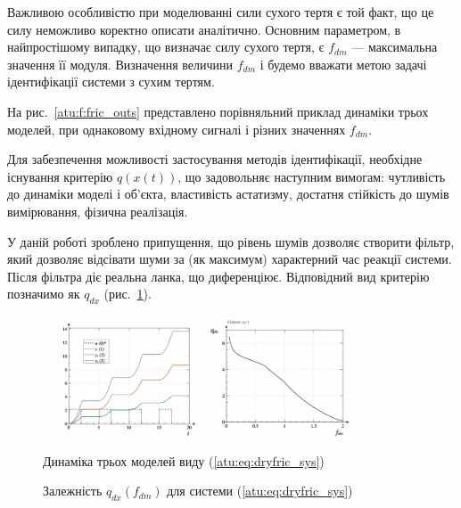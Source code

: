 \documentclass[a4paper,13pt]{atuaref}
\begin{document}
Важливою особливістю при моделюванні сили сухого тертя є той факт, що це силу
неможливо коректно описати аналітично. Основним параметром, в найпростішому
випадку, що визначає силу сухого тертя, є $f_{dm}$ --- максимальна значення її
модуля. Визначення величини  $f_{dm}$ і будемо вважати метою задачі ідентифікації
системи з сухим тертям.

На рис.~\ref{atu:f:fric_outs}
представлено порівняльний приклад динаміки трьох моделей,
при однаковому вхідному сигналі і різних значеннях $f_{dm}$.

Для забезпечення можливості застосування методів ідентифікації, необхідне
існування критерію $q (x (t))$, що задовольняє наступним вимогам: чутливість
до динаміки моделі і об'єкта, властивість астатизму, достатня стійкість до
шумів вимірювання, фізична реалізація.

У даній роботі зроблено припущення, що рівень шумів дозволяє створити фільтр, який
дозволяє відсівати шуми за (як максимум) характерний час реакції системи. Після
фільтра діє реальна ланка, що диференціює. Відповідний вид критерію позначимо як
$q_{dx}$ (рис.~\ref{atu:f:fric_q}).


\begin{figure}[htb!]
  {~} \hfill
  \includegraphics[width=0.40\textwidth]{p5/p/cha/fric/fric_outs1.png}
  \hfill
  \includegraphics[width=0.40\textwidth]{p5/p/cha/fric/fric_q-p_f_dm_q.png}
  \hfill {~}
  \\
  \parbox[t]{0.48\textwidth} {
    \caption{Динаміка трьох моделей виду (\ref{atu:eq:dryfric_sys})}
    \label{atu:f:fric_outs}
  } \hfill
  \parbox[t]{0.48\textwidth} {
    \caption{Залежність $q_{dx}(f_{dm})$ для системи (\ref{atu:eq:dryfric_sys}) }
    \label{atu:f:fric_q}
  }
\end{figure}
\end{document}
